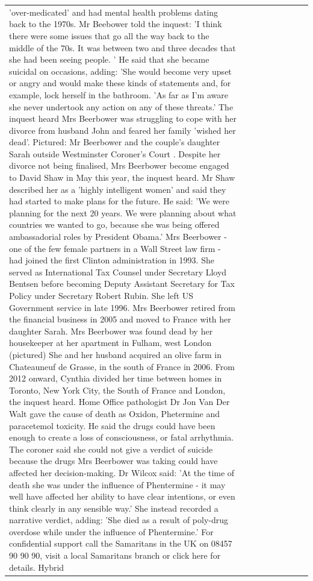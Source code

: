 \begin{table}[H]
\begin{tabular}{lllrlllll}
'over-medicated' and had mental health problems dating back to the 1970s. Mr Beebower told the inquest: 'I think there were some issues that go all the way back to the middle of the 70s. It was between two and three decades that she had been seeing people. ' He said that she became suicidal on occasions, adding: 'She would become very upset or angry and would make these kinds of statements and, for example, lock herself in the bathroom. 'As far as I'm aware she never undertook any action on any of these threats.' The inquest heard Mrs Beerbower was struggling to cope with her divorce from husband John and feared her family 'wished her dead'. Pictured: Mr Beerbower and the couple's daughter Sarah outside Westminster Coroner's Court . Despite her divorce not being finalised, Mrs Beerbower become engaged to David Shaw in May this year, the inquest heard. Mr Shaw described her as a 'highly intelligent women' and said they had started to make plans for the future. He said: 'We were planning for the next 20 years. We were planning about what countries we wanted to go, because she was being offered ambassadorial roles by President Obama.' Mrs Beerbower - one of the few female partners in a Wall Street law firm - had joined the first Clinton administration in 1993. She served as International Tax Counsel under Secretary Lloyd Bentsen before becoming Deputy Assistant Secretary for Tax Policy under Secretary Robert Rubin. She left US Government service in late 1996. Mrs Beerbower retired from the financial business in 2005 and moved to France with her daughter Sarah. Mrs Beerbower was found dead by her housekeeper at her apartment in Fulham, west London (pictured) She and her husband acquired an olive farm in Chateauneuf de Grasse, in the south of France in 2006. From 2012 onward, Cynthia divided her time between homes in Toronto, New York City, the South of France and London, the inquest heard. Home Office pathologist Dr Jon Van Der Walt gave the cause of death as Oxidon, Phetermine and paracetemol toxicity. He said the drugs could have been enough to create a loss of consciousness, or fatal arrhythmia. The coroner said she could not give a verdict of suicide because the drugs Mrs Beerbower was taking could have affected her decision-making. Dr Wilcox said: 'At the time of death she was under the influence of Phentermine - it may well have affected her ability to have clear intentions, or even think clearly in any sensible way.' She instead recorded a narrative verdict, adding: 'She died as a result of poly-drug overdose while under the influence of Phentermine.' For confidential support call the Samaritans in the UK on 08457 90 90 90, visit a local Samaritans branch or click here for details. Hybrid \\

\end{tabular}
\end{table}
